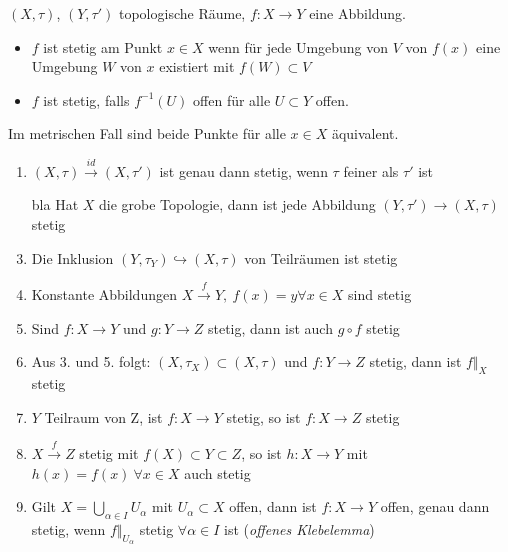 \begin{dfn}
    $(X,\tau)$, $(Y,\tau')$ topologische Räume, $f:X\to Y$ eine Abbildung.
    \begin{itemize}
        \item $f$ ist stetig am Punkt $x\in X$ wenn für jede Umgebung von $V$ von
            $f(x)$ eine Umgebung $W$ von $x$ existiert mit $f(W)\subset V$
        \item $f$ ist stetig, falls $f^{-1}(U)$ offen für alle $U\subset Y$ offen.
    \end{itemize}
    \begin{bem}
        Im metrischen Fall sind beide Punkte für alle $x\in X$ äquivalent.
    \end{bem}

    \begin{bsps}
        \begin{enumerate}
            \item $(X,\tau)\overset{id}{\to}(X,\tau')$ ist genau dann stetig, wenn
                $\tau$ feiner als $\tau'$ ist
            \item[bla] Hat $X$ die grobe Topologie, dann ist jede Abbildung
                $(Y,\tau')\to(X,\tau)$ stetig
            \item Die Inklusion $(Y,\tau_Y)\hookrightarrow (X,\tau)$ von Teilräumen
                ist stetig
            \item Konstante Abbildungen $X\overset{f}\to Y,\ f(x) = y \forall x\in X$
                sind stetig
            \item Sind $f:X\to Y$ und $g: Y\to Z$ stetig, dann ist auch $g\circ f$
                stetig
            \item Aus 3. und 5. folgt: $(X,\tau_X)\subset(X,\tau)$ und $f:Y\to Z$
                stetig, dann ist $f\Vert_X$ stetig
            \item $Y$ Teilraum von Z, ist $f:X\to Y$ stetig, so ist $f:X\to Z$ stetig
            \item $X\overset{f}\to Z$ stetig mit $f(X)\subset Y\subset Z$, so ist
                $h:X\to Y$ mit $h(x) = f(x)\ \forall x\in X$ auch stetig
            \item Gilt $X = \bigcup_{\alpha\in I}U_\alpha$ mit $U_\alpha\subset X$
                offen, dann ist $f:X\to Y$ offen, genau dann stetig, wenn
                $f\Vert_{U_\alpha}$ stetig $\forall\alpha\in I$ ist (\emph{offenes
                Klebelemma})
        \end{enumerate}
    \end{bsps}
\end{dfn}

